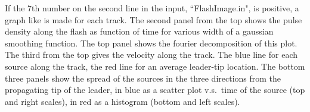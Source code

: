 If the 7th number on the second line in the input, ``FlashImage.in", is positive, a graph like  is made for each track. The second panel from the top shows the pulse density along the flash as function of time for various width of a gaussian smoothing function. The top panel shows the fourier decomposition of this plot. The third from the top gives the velocity along the track. The blue line for each source along the track, the red line for an average leader-tip location. The bottom three panels show the spread of the sources in the three directions from the propagating tip of the leader, in blue as a scatter plot v.s.\ time of the source (top and right scales), in red as a histogram (bottom and left scales).
\clearpage 
